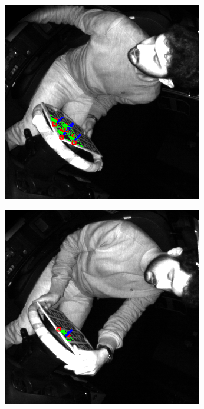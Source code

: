 \begin{figure}[htpb]
\begin{subfigure}[t]{0.23\textwidth}
    \end{subfigure}\hfill
    \begin{subfigure}[t]{0.23\textwidth}
        \centering
        \includegraphics[width=\textwidth]{media/chapter 5/aruco_board_estimation2.png}
    \end{subfigure}\hfill
    \begin{subfigure}[t]{0.23\textwidth}
        \centering
        \includegraphics[width=\textwidth]{media/chapter 5/aruco_board_estimation3.png}

\end{subfigure}
\end{figure}
